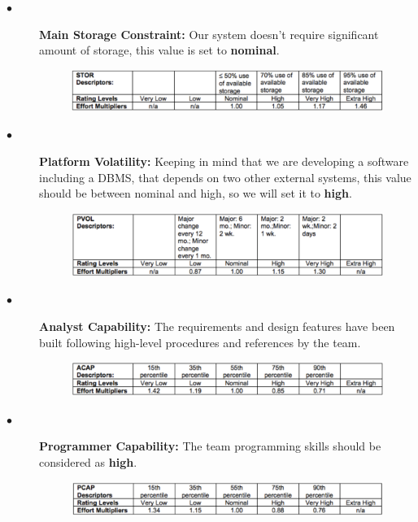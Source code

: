 \documentclass[a4paper,10pt]{article}
\begin{document}
\begin{description}
  \item[$\bullet$] \textbf{Main Storage Constraint:} Our system doesn’t require significant amount of storage, this value is set to \textbf{nominal}.
          \begin{figure}[!h]
  \centering
    \includegraphics[scale=0.32]{Resources/cocomo/stor.png}
  \end{figure}\FloatBarrier
  \item[$\bullet$] \textbf{Platform Volatility:} Keeping in mind that we are developing a software including a DBMS, that depends on two other external systems, this value should be between nominal and high, so we will set it to \textbf{high}.
          \begin{figure}[!h]
  \centering
    \includegraphics[scale=0.32]{Resources/cocomo/pvol.png}
  \end{figure}
  \item[$\bullet$] \textbf{Analyst Capability:} The requirements and design features have been built following high-level procedures and references by the team. 
          \begin{figure}[!h]
  \centering
    \includegraphics[scale=0.32]{Resources/cocomo/acap.png}
  \end{figure}\FloatBarrier
  \item[$\bullet$] \textbf{Programmer Capability:} The team programming skills should be considered as \textbf{high}.
          \begin{figure}[!h]
  \centering
    \includegraphics[scale=0.32]{Resources/cocomo/pcap.png}
  \end{figure}\FloatBarrier

\end{description}
\end{document}

